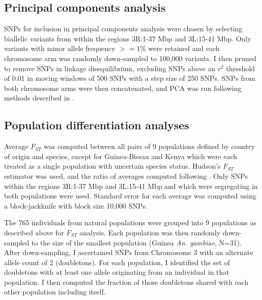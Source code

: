 \begin{refsection}
\subsection{Principal components analysis}\label{subsec:methods-pca}


SNPs for inclusion in principal components analysis were chosen by selecting biallelic variants from within the regions 3R:1-37 Mbp and 3L:15-41 Mbp.
%
Only variants with minor allele frequency $>=1\%$ were retained and each chromosome arm was randomly down-sampled to 100,000 variants.
%
I then pruned to remove SNPs in linkage disequilibrium, excluding SNPs above an $r^2$ threshold of 0.01 in moving windows of 500 SNPs with a step size of 250 SNPs.
%
SNPs from both chromosome arms were then concatenated, and PCA was run following methods described in \textcite{Patterson2006}.


\subsection{Population differentiation analyses}\label{subsec:methods-popdiff}


Average $F_{ST}$ was computed between all pairs of 9 populations defined by country of origin and species, except for Guinea-Bissau and Kenya which were each treated as a single population with uncertain species status.
%
Hudson's $F_{ST}$ estimator was used, and the ratio of averages computed following \textcite{Bhatia2013}.
%
Only SNPs within the regions 3R:1-37 Mbp and 3L:15-41 Mbp and which were segregating in both populations were used.
%
Standard error for each average was computed using a block-jackknife with block size 10,000 SNPs.


The 765 individuals from natural populations were grouped into 9 populations as described above for $F_{ST}$ analysis.
%
Each population was then randomly down-sampled to the size of the smallest population (Guinea \textit{An. gambiae}, N=31).
%
After down-sampling, I ascertained SNPs from Chromosome 3 with an alternate allele count of 2 (doubletons).
%
For each population, I identified the set of doubletons with at least one allele originating from an individual in that population.
%
I then computed the fraction of those doubletons shared with each other population including itself.



\end{refsection}
